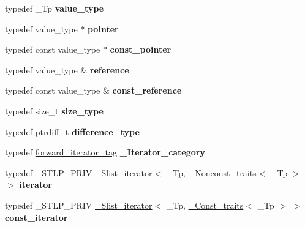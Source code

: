 \begin{DoxyCompactItemize}
\item 
\mbox{\label{classslist_afa1bad898a7ba1cc8fd08c8e5e5f9a1c}} 
typedef \+\_\+\+Tp {\bfseries value\+\_\+type}
\item 
\mbox{\label{classslist_a58acf9c024ec300b5e2db9f3ca7d9daa}} 
typedef value\+\_\+type $\ast$ {\bfseries pointer}
\item 
\mbox{\label{classslist_a07610436dfec19284e3540b4e717d83a}} 
typedef const value\+\_\+type $\ast$ {\bfseries const\+\_\+pointer}
\item 
\mbox{\label{classslist_aebb1688a50407c646984dcbfa64b4579}} 
typedef value\+\_\+type \& {\bfseries reference}
\item 
\mbox{\label{classslist_a505252adea09cef998d66525a493359f}} 
typedef const value\+\_\+type \& {\bfseries const\+\_\+reference}
\item 
\mbox{\label{classslist_a30df20d89ac6a2a70a32aadf6aab3bd3}} 
typedef size\+\_\+t {\bfseries size\+\_\+type}
\item 
\mbox{\label{classslist_afe887349efa14b7b924df460ce73eeae}} 
typedef ptrdiff\+\_\+t {\bfseries difference\+\_\+type}
\item 
\mbox{\label{classslist_a9ca5a6dde57031c7ac0b2d98cb5b2cb9}} 
typedef \hyperlink{structforward__iterator__tag}{forward\+\_\+iterator\+\_\+tag} {\bfseries \+\_\+\+Iterator\+\_\+category}
\item 
\mbox{\label{classslist_a0f3012909a4303c85baf8f15257e6edf}} 
typedef \+\_\+\+S\+T\+L\+P\+\_\+\+P\+R\+IV \hyperlink{class___slist__iterator}{\+\_\+\+Slist\+\_\+iterator}$<$ \+\_\+\+Tp, \hyperlink{struct___nonconst__traits}{\+\_\+\+Nonconst\+\_\+traits}$<$ \+\_\+\+Tp $>$ $>$ {\bfseries iterator}
\item 
\mbox{\label{classslist_acc66cea7d874af8df949163b25abdedf}} 
typedef \+\_\+\+S\+T\+L\+P\+\_\+\+P\+R\+IV \hyperlink{class___slist__iterator}{\+\_\+\+Slist\+\_\+iterator}$<$ \+\_\+\+Tp, \hyperlink{struct___const__traits}{\+\_\+\+Const\+\_\+traits}$<$ \+\_\+\+Tp $>$ $>$ {\bfseries const\+\_\+iterator}

\end{DoxyCompactItemize}
